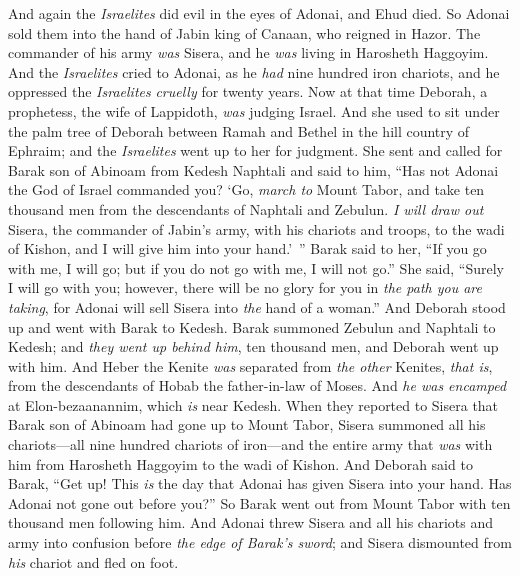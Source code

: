 \begin{biblechapter} %
 And again the \textit{Israelites} did evil in the eyes of Adonai, and Ehud died.
\verse So Adonai sold them into the hand of Jabin king of Canaan, who reigned in Hazor. The commander of his army \textit{was} Sisera, and he \textit{was} living in Harosheth Haggoyim.
\verse And the \textit{Israelites} cried to Adonai, as he \textit{had} nine hundred iron chariots, and he oppressed the \textit{Israelites} \textit{cruelly} for twenty years.
\verse Now at that time Deborah, a prophetess, the wife of Lappidoth, \textit{was} judging Israel.
\verse And she used to sit under the palm tree of Deborah between Ramah and Bethel in the hill country of Ephraim; and the \textit{Israelites} went up to her for judgment.
\verse She sent and called for Barak son of Abinoam from Kedesh Naphtali and said to him, “Has not Adonai the God of Israel commanded you? ‘Go, \textit{march to} Mount Tabor, and take ten thousand men from the descendants of Naphtali and Zebulun.
\verse \textit{I will draw out} Sisera, the commander of Jabin’s army, with his chariots and troops, to the wadi of Kishon, and I will give him into your hand.’ ”
\verse Barak said to her, “If you go with me, I will go; but if you do not go with me, I will not go.”
\verse She said, “Surely I will go with you; however, there will be no glory for you in \textit{the path you are taking}, for Adonai will sell Sisera into \textit{the} hand of a woman.” And Deborah stood up and went with Barak to Kedesh.
\verse Barak summoned Zebulun and Naphtali to Kedesh; and \textit{they went up behind him}, ten thousand men, and Deborah went up with him.
\verse And Heber the Kenite \textit{was} separated from \textit{the other} Kenites, \textit{that is}, from the descendants of Hobab the father-in-law of Moses. And \textit{he was encamped} at Elon-bezaanannim, which \textit{is} near Kedesh.
\verse When they reported to Sisera that Barak son of Abinoam had gone up to Mount Tabor,
\verse Sisera summoned all his chariots—all nine hundred chariots of iron—and the entire army that \textit{was} with him from Harosheth Haggoyim to the wadi of Kishon.
\verse And Deborah said to Barak, “Get up! This \textit{is} the day that Adonai has given Sisera into your hand. Has Adonai not gone out before you?” So Barak went out from Mount Tabor with ten thousand men following him.
\verse And Adonai threw Sisera and all his chariots and army into confusion before \textit{the edge of Barak’s sword}; and Sisera dismounted from \textit{his} chariot and fled on foot.

\end{biblechapter}
